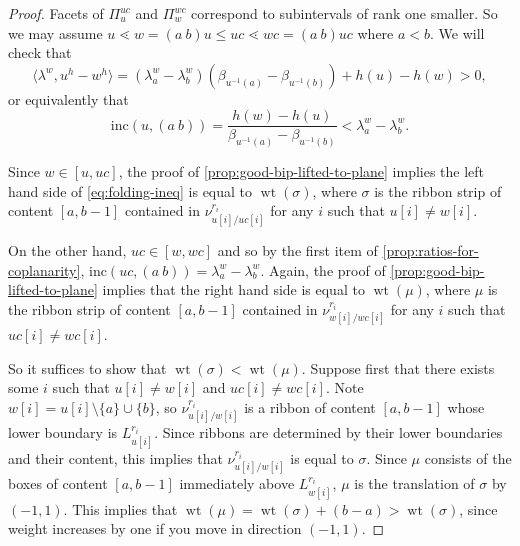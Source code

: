 \documentclass[11pt]{amsart}
\theoremstyle{definition}
\DeclareMathOperator{\wt}{wt}
\def\lin{\lambda}
\def\hgt{h}
\def\path{L}
\def\skew{\nu}
\def\pt{\beta}
\def\steep{{\mathrm {inc}}}
\begin{document}
\begin{proof}
	Facets of $\Pi_u ^{uc}$ and $\Pi_w^{wc}$ correspond to subintervals of rank one smaller. So we may assume $u \lessdot w= (a~b) u \le uc \lessdot wc= (a~b) uc$ where $a<b$. We will check that
	\[\langle \lin^w, u^{\hgt}- w^{\hgt}\rangle = (\lin^w_a - \lin^w_b) (\pt_{u^{-1}(a)}- \pt_{u^{-1}(b)}) + \hgt(u)- \hgt(w) >0, \]
	or equivalently that
	\begin{equation}\label{eq:folding-ineq}
		\steep(u, (a~b))=\frac{\hgt(w)- \hgt(u)}{\pt_{u^{-1}(a)}- \pt_{u^{-1}(b)}} <\lin^w_a - \lin^w_b.
	\end{equation}
	
	Since $w \in [u, uc]$, the proof of \cref{prop:good-bip-lifted-to-plane} implies the left hand side of \eqref{eq:folding-ineq} is equal to $\wt(\sigma)$, where $\sigma$ is the ribbon strip of content $[a,b-1]$ contained in $\skew_{u[i]/uc[i]}^{r_i}$ for any $i$ such that $u[i] \neq w[i]$.
	
	On the other hand, $uc \in [w,wc]$ and so by the first item of \cref{prop:ratios-for-coplanarity}, $\steep(uc, (a~b)) = \lin^w_a - \lin^w_b$. 
	Again, the proof of \cref{prop:good-bip-lifted-to-plane} implies that the right hand side is equal to $\wt(\mu)$, where $\mu$ is the ribbon strip of content $[a,b-1]$ contained in $\skew_{w[i]/wc[i]}^{r_i}$ for any $i$ such that $uc[i] \neq wc[i]$.
	
	So it suffices to show that $\wt(\sigma) < \wt(\mu)$. Suppose first that there exists some $i$ such that $u[i] \neq w[i]$ and $uc[i] \neq wc[i]$. Note $w[i]= u[i] \setminus \{a\} \cup \{b\}$, so $\skew_{u[i]/w[i]}^{r_i}$ is a ribbon of content $[a,b-1]$ whose lower boundary is $\path_{u[i]}^{r_i}$. Since ribbons are determined by their lower boundaries and their content, this implies that $\skew_{u[i]/w[i]}^{r_i}$ is equal to $\sigma$. Since $\mu$ consists of the boxes of content $[a, b-1]$ immediately above $\path_{w[i]}^{r_i}$, $\mu$ is the translation of $\sigma$ by $(-1,1)$. This implies that $\wt(\mu)= \wt(\sigma)+ (b-a) >\wt(\sigma)$, since weight increases by one if you move in direction $(-1,1)$.
	

\end{proof}
\end{document}
